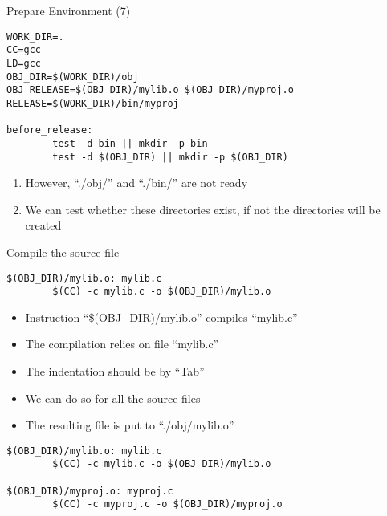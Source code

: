 \begin{frame}[fragile]{Prepare Environment (7)}
\lstset{language=[gnu] make}
\begin{lstlisting}[linewidth=0.9\linewidth, xleftmargin=0.05\linewidth]
WORK_DIR=.
CC=gcc
LD=gcc
OBJ_DIR=$(WORK_DIR)/obj
OBJ_RELEASE=$(OBJ_DIR)/mylib.o $(OBJ_DIR)/myproj.o
RELEASE=$(WORK_DIR)/bin/myproj

before_release:
        test -d bin || mkdir -p bin
        test -d $(OBJ_DIR) || mkdir -p $(OBJ_DIR)
\end{lstlisting}

\begin{enumerate}
	\item {However, ``./obj/'' and ``./bin/'' are not ready }
	\item {We can test whether these directories exist, if not the directories will be created}
\end{enumerate}
\end{frame}

\begin{frame}[fragile]{Compile the source file}
\lstset{language=[gnu] make}
\begin{lstlisting}[linewidth=0.9\linewidth, xleftmargin=0.05\linewidth]
$(OBJ_DIR)/mylib.o: mylib.c
        $(CC) -c mylib.c -o $(OBJ_DIR)/mylib.o
\end{lstlisting}
\vspace{-0.15in}
\begin{itemize}
	\item {Instruction ``\$(OBJ\_DIR)/mylib.o'' compiles ``mylib.c''}
	\item {The compilation relies on file ``mylib.c''}
	\item {The indentation should  be by ``Tab''}
	\item {We can do so for all the source files}
	\item {The resulting file is put to ``./obj/mylib.o'' }
\end{itemize}
\begin{lstlisting}[linewidth=0.9\linewidth, xleftmargin=0.05\linewidth]
$(OBJ_DIR)/mylib.o: mylib.c
        $(CC) -c mylib.c -o $(OBJ_DIR)/mylib.o
        
$(OBJ_DIR)/myproj.o: myproj.c
        $(CC) -c myproj.c -o $(OBJ_DIR)/myproj.o
\end{lstlisting}
\end{frame}

